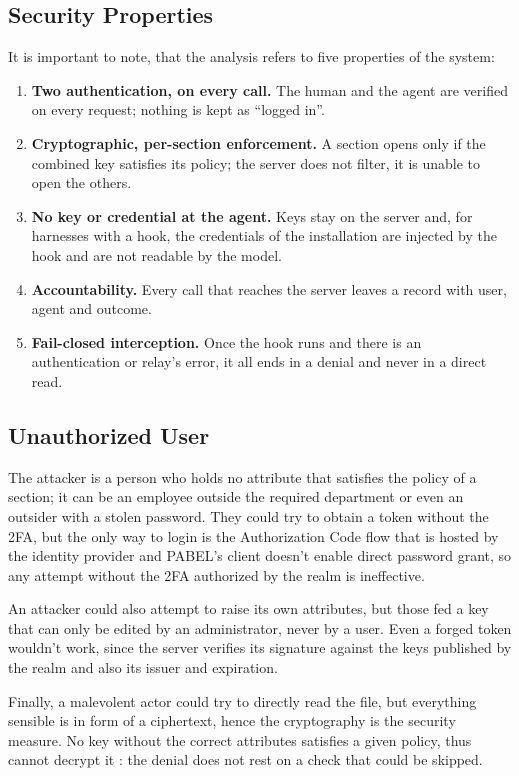 \subsection{Security Properties}
It is important to note, that the analysis refers to five properties of the system:
\begin{enumerate}
  \item[\textbf{P1}] \textbf{Two authentication, on every call.} The human and the agent are verified on every request; nothing is kept as ``logged in''.
  \item[\textbf{P2}] \textbf{Cryptographic, per-section enforcement.} A section opens only if the combined key satisfies its policy; the server does not filter, it is unable to open the others.
  \item[\textbf{P3}] \textbf{No key or credential at the agent.} Keys stay on the server and, for harnesses with a hook, the credentials of the installation are injected by the hook and are not readable by the model.
  \item[\textbf{P4}] \textbf{Accountability.} Every call that reaches the server leaves a record with user, agent and outcome.
  \item[\textbf{P5}] \textbf{Fail-closed interception.} Once the hook runs and there is an authentication or relay's error, it all ends in a denial and never in a direct read.
\end{enumerate}

\subsection{Unauthorized User}
The attacker is a person who holds no attribute that satisfies the policy of a section; it can be an employee outside the required department or even an outsider with a stolen password.
They could try to obtain a token without the 2FA, but the only way to login is the Authorization Code flow that is hosted by the identity provider and PABEL's client doesn't enable direct password grant, so any attempt without the 2FA authorized by the realm is ineffective.

An attacker could also attempt to raise its own attributes, but those fed a key that can only be edited by an administrator, never by a user.
Even a forged token wouldn't work, since the server verifies its signature against the keys published by the realm and also its issuer and expiration.

Finally, a malevolent actor could try to directly read the file, but everything sensible is in form of a ciphertext, hence the cryptography is the security measure.
No key without the correct attributes satisfies a given policy, thus cannot decrypt it \cite{bethencourt2007ciphertext}: the denial does not rest on a check that could be skipped.


